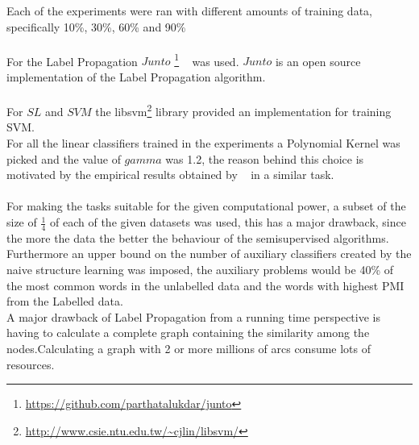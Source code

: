 \documentclass[4pt,a4paper,twocolumn]{article}
\begin{document}
Each of the experiments were ran with different amounts of training data, specifically 10\%, 30\%, 60\% and 90\%\\
\\
For the Label Propagation  $Junto$ \footnote{ \url{https://github.com/parthatalukdar/junto} } ~\cite{Talukdar:2010:EGS:1858681.1858830} was used. $Junto$ is an open source implementation of the Label Propagation algorithm.\\
\\
For $SL$ and $SVM$ the libsvm\footnote{\url{http://www.csie.ntu.edu.tw/~cjlin/libsvm/}} library provided an implementation for training SVM.\\
For all the linear classifiers trained in the experiments a  Polynomial Kernel was picked and the value of $gamma$ was 1.2, the reason behind this choice is motivated by the empirical results obtained by ~\cite{Joachims:1998:TCS:645326.649721} in a similar task.\\
\\
For making the tasks suitable for the given computational power, a subset of the size of $\frac{1}{4}$ of each of the given datasets was used, this has a major drawback, since the more the data the better the behaviour of the semisupervised algorithms.
Furthermore an upper bound on the number of auxiliary classifiers created by  the naive structure learning was imposed, the auxiliary problems would be 40\% of the most common words in the unlabelled data and the words with highest PMI from the Labelled data.\\
A major drawback of Label Propagation from a running time perspective is having to calculate a complete graph containing the similarity among the nodes.Calculating a graph with 2 or more millions of arcs consume lots of resources.
\end{document}
